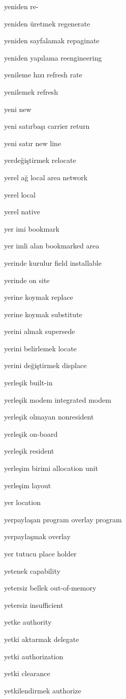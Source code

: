 \documentclass[12pt,fleqn]{article}\usepackage{../../common}
\begin{document}
yeniden re-

yeniden üretmek regenerate

yeniden sayfalamak repaginate

yeniden yapılama reengineering

yenileme hızı refresh rate

yenilemek refresh

yeni new

yeni satırbaşı carrier return

yeni satır new line

yerdeğiştirmek relocate

yerel ağ local area network

yerel local

yerel native

yer imi bookmark

yer imli alan bookmarked area

yerinde kurulur field installable

yerinde on site

yerine koymak replace

yerine koymak substitute

yerini almak supersede

yerini belirlemek locate

yerini değiştirmek displace

yerleşik built-in

yerleşik modem integrated modem

yerleşik olmayan nonresident

yerleşik on-board

yerleşik resident

yerleşim birimi allocation unit

yerleşim layout

yer location

yerpaylaşan program overlay program

yerpaylaşmak overlay

yer tutucu place holder

yetenek capability

yetersiz bellek out-of-memory

yetersiz insufficient

yetke authority

yetki aktarmak delegate

yetki authorization

yetki clearance

yetkilendirmek authorize
\end{document}
